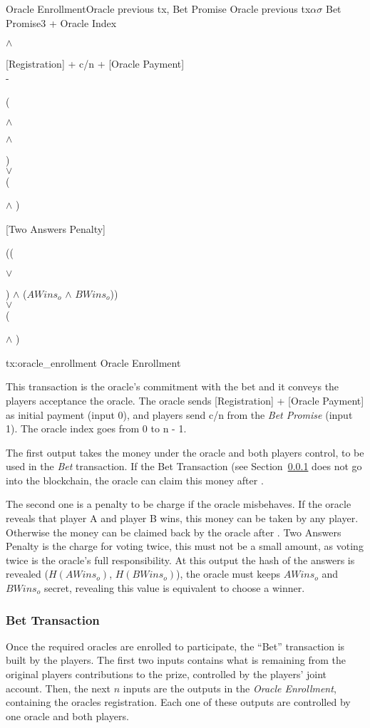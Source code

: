 \transaction%
    {Oracle Enrollment}{Oracle previous tx, Bet Promise}
   {Oracle previous tx}{$\alpha$}{$\sigma$}
   {Bet Promise}{3 + Oracle Index}{\signature{A} $\wedge$ \signature{B}}
    \stopinputs
   {[Registration] + c/n + [Oracle Payment] \\ - }
       {(\signature{Oracle} $\wedge$ \signature{A} $\wedge$ \signature{B}) \\
           $\vee$ \\
        (\signature{Oracle} $\wedge$ )}
   {[Two Answers Penalty]}{((\signature{A} $\vee$ \signature{B}) $\wedge$ %
                            ($AWins_o$ $\wedge$ $BWins_o$)) \\
                          $\vee$ \\
                      (\signature{Oracle} $\wedge$ )}
    \stopoutputs
    {tx:oracle_enrollment}
    {Oracle Enrollment}

This transaction is the oracle's commitment with the bet and it conveys the
  players acceptance the oracle.
The oracle sends [Registration] + [Oracle Payment] as initial payment
  (input 0), and players send c/n from the \textit{Bet Promise} (input 1).
The oracle index goes from 0 to n - 1.

The first output takes the money under the oracle and both players control, to
  be used in the \textit{Bet} transaction.
If the Bet Transaction (see Section~\ref{subsec:bet_transaction} does not go
  into the blockchain, the oracle can claim this money after .

The second one is a penalty to be charge if the oracle misbehaves.
If the oracle reveals that player A and player B wins, this money can be taken
  by any player. Otherwise the money can be claimed back by the oracle after
  .
Two Answers Penalty is the charge for voting twice, this must not be a small
  amount, as voting twice is the oracle's full responsibility.
At this output the hash of the answers is revealed ($H(AWins_o)$, $H(BWins_o)$),
  the oracle must keeps $AWins_o$ and $BWins_o$ secret, revealing this value is
  equivalent to choose a winner.

\subsubsection{Bet Transaction} \label{subsec:bet_transaction}

Once the required oracles are enrolled to participate, the ``Bet'' transaction
  is built by the players.
 The first two inputs contains what is remaining from the original players
   contributions to the prize, controlled by the players' joint account.
Then, the next $n$ inputs are the outputs in the \textit{Oracle Enrollment},
  containing the oracles registration.
Each one of these outputs are controlled by one oracle and both players.

